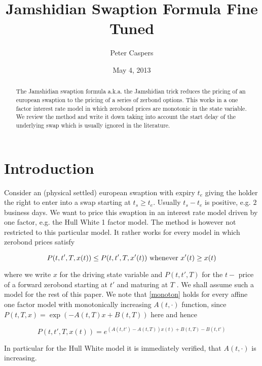 \documentclass{amsart}
\theoremstyle{plain}
\numberwithin{equation}{section}
\begin{document}
\title[Jamshidian Swaption Formula Fine Tuned]{Jamshidian Swaption Formula Fine Tuned}
\author{Peter Caspers}
\date{May 4, 2013}
\begin{abstract}
The Jamshidian swaption formula a.k.a. the Jamshidian trick reduces the pricing of an european swaption to the pricing of a series of
zerbond options. This works in a one factor interest rate model in which zerobond prices are monotonic in the state variable. We review
the method and write it down taking into account the start delay of the underlying swap which is usually ignored in the literature.
\end{abstract}

\maketitle

\section{Introduction}

Consider an (physical settled) european swaption with expiry $t_e$ giving the holder the right to enter into a swap starting at $t_s \geq t_e$. Usually $t_s-t_e$
is positive, e.g. $2$ business days. We want to price this swaption in an interest rate model driven by one factor, e.g. the Hull White 1 factor model.
The method is however not restricted to this particular model. It rather works for every model in which zerobond prices satisfy

\begin{equation}\label{monoton}
P(t,t',T,x(t)) \leq P(t,t',T,x'(t)) \textnormal{ whenever } x'(t) \geq x(t)
\end{equation}

where we write $x$ for the driving state variable and $P(t,t',T)$ for the $t-$ price of a forward zerobond starting at $t'$ and maturing at $T$ . We shall assume such a model for the rest of this paper. We note that \ref{monoton} holds for every affine one factor model with monotonically increasing $A(t,\cdot)$ function, since $P(t,T,x)=\exp(-A(t,T)x+B(t,T))$ here and hence

\begin{equation}
P(t,t',T,x(t)) = e^{(A(t,t')-A(t,T))x(t)+B(t,T)-B(t,t')}
\end{equation}

In particular for the Hull White model it is immediately verified, that $A(t,\cdot)$ is increasing.
\end{document}
